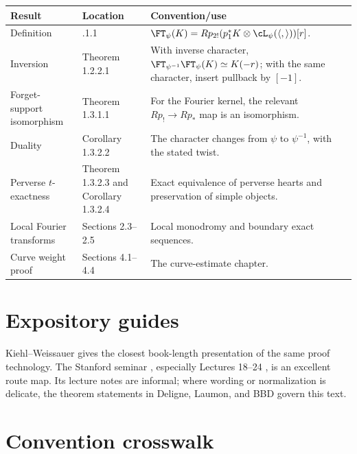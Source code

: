 \begin{longtable}{
 >{\raggedright\arraybackslash}p{}
 >{\raggedright\arraybackslash}p{}
 >{\raggedright\arraybackslash}p{}}
\toprule
Result & Location & Convention/use\\
\midrule
\endhead
Definition &
1.2.1.1 &
\(\FT_\psi(K)=Rp_{2!}(p_1^*K\otimes\cL_\psi(\langle,\rangle))[r]\).\\

Inversion &
Theorem 1.2.2.1 &
With inverse character,
\(\FT_{\psi^{-1}}\FT_\psi(K)\simeq K(-r)\); with the same character,
insert pullback by \([-1]\).\\

Forget-support isomorphism &
Theorem 1.3.1.1 &
For the Fourier kernel, the relevant \(Rp_!\to Rp_*\) map is an isomorphism.\\

Duality &
Corollary 1.3.2.2 &
The character changes from \(\psi\) to \(\psi^{-1}\), with the stated twist.\\

Perverse \(t\)-exactness &
Theorem 1.3.2.3 and Corollary 1.3.2.4 &
Exact equivalence of perverse hearts and preservation of simple objects.\\

Local Fourier transforms &
Sections 2.3--2.5 &
Local monodromy and boundary exact sequences.\\

Curve weight proof &
Sections 4.1--4.4 &
The curve-estimate chapter.\\
\bottomrule
\end{longtable}

\section{Expository guides}

Kiehl--Weissauer \cite{KiehlWeissauer} gives the closest book-length
presentation of the same proof technology.  The Stanford seminar
\cite{StanfordWeilIISeminar}, especially Lectures 18--24
\cite{StanfordL18,StanfordL19,StanfordL22,StanfordL23,StanfordL24}, is an
excellent route map.  Its lecture notes are informal; where wording or
normalization is delicate, the theorem statements in Deligne, Laumon, and BBD
govern this text.

\section{Convention crosswalk}

